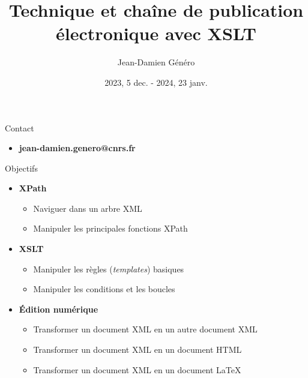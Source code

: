 \documentclass{beamer}
\title{Technique et chaîne de publication électronique avec XSLT}
\date{2023, 5 dec. - 2024, 23 janv.}
\author{Jean-Damien Généro}
\institute{École nationale des chartes -- M2 TNAH}
\begin{document}
  \maketitle
  
  \begin{frame}{Contact}
  \Large
      \begin{itemize}
          \item \textbf{jean-damien.genero@cnrs.fr}
      \end{itemize}
  \end{frame}


    \begin{frame}{Objectifs}
  \Large
      \begin{itemize}
          \item \textbf{XPath}
          \begin{itemize}
              \item Naviguer dans un arbre XML
              \item Manipuler les principales fonctions XPath
          \end{itemize}
          \item \textbf{XSLT}
          \begin{itemize}
              \item Manipuler les règles (\textit{templates}) basiques
              \item Manipuler les conditions et les boucles
          \end{itemize}
          \item \textbf{Édition numérique}
          \begin{itemize}
              \item Transformer un document XML en un autre document XML
              \item Transformer un document XML en un document HTML
              \item Transformer un document XML en un document \LaTeX
          \end{itemize}
      \end{itemize}
  \end{frame}
   
\end{document}
